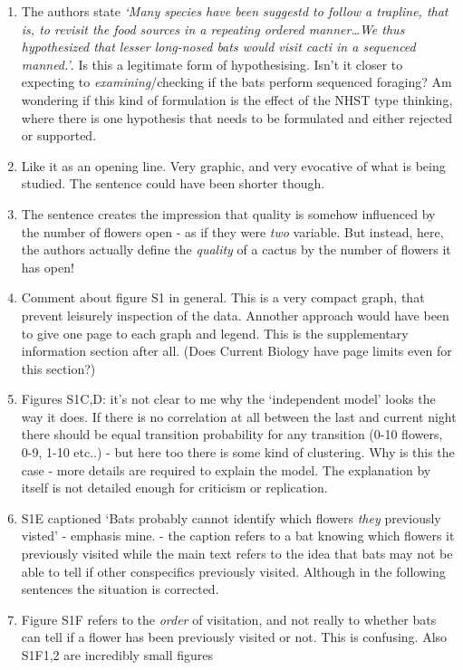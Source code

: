\documentclass[
]{book}
\providecommand{\tightlist}{%
  \setlength{\itemsep}{0pt}\setlength{\parskip}{0pt}}
\begin{document}
\begin{enumerate}
\def\labelenumi{\arabic{enumi}.}
\tightlist
\item
  The authors state \emph{`Many species have been suggestd to follow a trapline, that is, to revisit the food sources in a repeating ordered manner\ldots We thus hypothesized that lesser long-nosed bats would visit cacti in a sequenced manned.'}. Is this a legitimate form of hypothesising. Isn't it closer to expecting to \emph{examining}/checking if the bats perform sequenced foraging? Am wondering if this kind of formulation is the effect of the NHST type thinking, where there is one hypothesis that needs to be formulated and either rejected or supported.
\item
  Like it as an opening line. Very graphic, and very evocative of what is being studied. The sentence could have been shorter though.
\item
  The sentence creates the impression that quality is somehow influenced by the number of flowers open - as if they were \emph{two} variable. But instead, here, the authors actually define the \emph{quality} of a cactus by the number of flowers it has open!
\item
  Comment about figure S1 in general. This is a very compact graph, that prevent leisurely inspection of the data. Annother approach would have been to give one page to each graph and legend. This is the supplementary information section after all. (Does Current Biology have page limits even for this section?)
\item
  Figures S1C,D: it's not clear to me why the `independent model' looks the way it does. If there is no correlation at all between the last and current night there should be equal transition probability for any transition (0-10 flowers, 0-9, 1-10 etc..) - but here too there is some kind of clustering. Why is this the case - more details are required to explain the model. The explanation by itself is not detailed enough for criticism or replication.
\item
  S1E captioned `Bats probably cannot identify which flowers \emph{they} previously visted' - emphasis mine. - the caption refers to a bat knowing which flowers it previously visited while the main text refers to the idea that bats may not be able to tell if other conspecifics previously visited. Although in the following sentences the situation is corrected.
\item
  Figure S1F refers to the \emph{order} of visitation, and not really to whether bats can tell if a flower has been previously visited or not. This is confusing. Also S1F1,2 are incredibly small figures

\end{enumerate}
\end{document}
